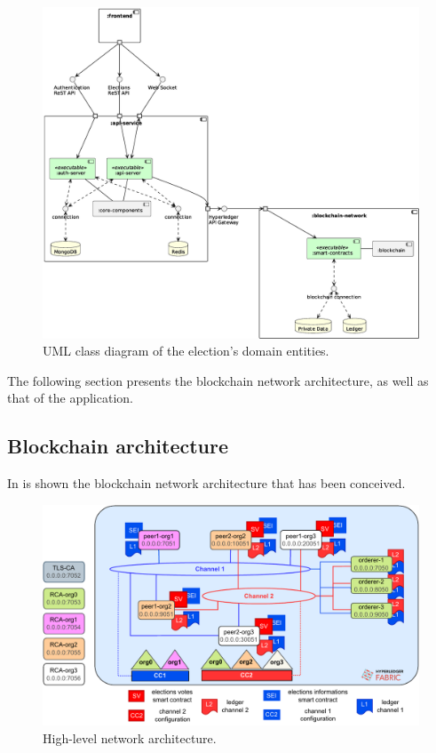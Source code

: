 \documentclass{scrartcl}
\begin{document}
\begin{landscape}
    \begin{figure}
        \centering
        \includegraphics[width=\linewidth]{figures/system-architecture.eps}
        \caption{UML class diagram of the election's domain entities.}
        \label{fig:system-architecture} 
    \end{figure}
\end{landscape}

\iffalse

The following section presents the blockchain network architecture, as well as that of the application.

\subsection{Blockchain architecture}
\label{subsec:blockchain-architecture}

In  is shown the blockchain network architecture that has been conceived.

\begin{figure}
    \centering
    \includegraphics[width=\linewidth]{figures/network-architecture.pdf}
    \caption{High-level network architecture.}
    \label{fig:network-architecture}
\end{figure}
\end{document}
